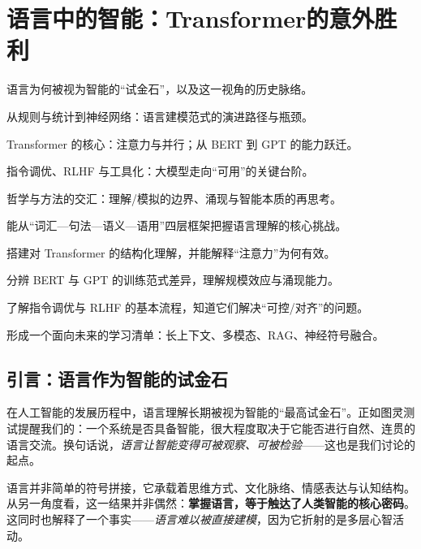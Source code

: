 
\chapter{语言中的智能：Transformer的意外胜利}

\begin{introduction}
  \item 语言为何被视为智能的“试金石”，以及这一视角的历史脉络。
  \item 从规则与统计到神经网络：语言建模范式的演进路径与瓶颈。
  \item Transformer 的核心：注意力与并行；从 BERT 到 GPT 的能力跃迁。
  \item 指令调优、RLHF 与工具化：大模型走向“可用”的关键台阶。
  \item 哲学与方法的交汇：理解/模拟的边界、涌现与智能本质的再思考。
\end{introduction}

\begin{introduction}
  \item 能从“词汇—句法—语义—语用”四层框架把握语言理解的核心挑战。
  \item 搭建对 Transformer 的结构化理解，并能解释“注意力”为何有效。
  \item 分辨 BERT 与 GPT 的训练范式差异，理解规模效应与涌现能力。
  \item 了解指令调优与 RLHF 的基本流程，知道它们解决“可控/对齐”的问题。
  \item 形成一个面向未来的学习清单：长上下文、多模态、RAG、神经符号融合。
\end{introduction}

\section{引言：语言作为智能的试金石}

在人工智能的发展历程中，语言理解长期被视为智能的“最高试金石”。正如图灵测试提醒我们的：一个系统是否具备智能，很大程度取决于它能否进行自然、连贯的语言交流。换句话说，\emph{语言让智能变得可被观察、可被检验}——这也是我们讨论的起点。

语言并非简单的符号拼接，它承载着思维方式、文化脉络、情感表达与认知结构。从另一角度看，这一结果并非偶然：\textbf{掌握语言，等于触达了人类智能的核心密码}。这同时也解释了一个事实——\emph{语言难以被直接建模}，因为它折射的是多层心智活动。

